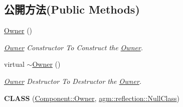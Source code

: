 \subsection*{公開方法(Public Methods)}
\begin{DoxyCompactItemize}
\item 
\hyperlink{class_i_dream_sky_1_1_component_1_1_owner_aca1a7487123900c93da0de29a5974f8b}{Owner} ()\hypertarget{class_i_dream_sky_1_1_component_1_1_owner_aca1a7487123900c93da0de29a5974f8b}{}\label{class_i_dream_sky_1_1_component_1_1_owner_aca1a7487123900c93da0de29a5974f8b}

\begin{DoxyCompactList}\small\item\em \hyperlink{class_i_dream_sky_1_1_component_1_1_owner}{Owner} Constructor To Construct the \hyperlink{class_i_dream_sky_1_1_component_1_1_owner}{Owner}. \end{DoxyCompactList}\item 
virtual \hyperlink{class_i_dream_sky_1_1_component_1_1_owner_af1b9c8d2c072df49f7db39592e016b44}{$\sim$\+Owner} ()\hypertarget{class_i_dream_sky_1_1_component_1_1_owner_af1b9c8d2c072df49f7db39592e016b44}{}\label{class_i_dream_sky_1_1_component_1_1_owner_af1b9c8d2c072df49f7db39592e016b44}

\begin{DoxyCompactList}\small\item\em \hyperlink{class_i_dream_sky_1_1_component_1_1_owner}{Owner} Destructor To Destructor the \hyperlink{class_i_dream_sky_1_1_component_1_1_owner}{Owner}. \end{DoxyCompactList}\item 
{\bfseries C\+L\+A\+SS} (\hyperlink{class_i_dream_sky_1_1_component_1_1_owner}{Component\+::\+Owner}, \hyperlink{classagm_1_1reflection_1_1_null_class}{agm\+::reflection\+::\+Null\+Class})\hypertarget{class_i_dream_sky_1_1_component_1_1_owner_abe37d86ac068353e0923282aca3e368b}{}\label{class_i_dream_sky_1_1_component_1_1_owner_abe37d86ac068353e0923282aca3e368b}


\end{DoxyCompactItemize}
